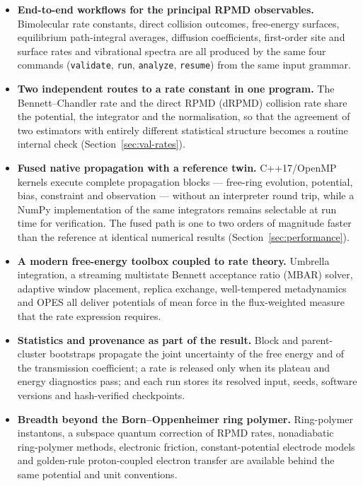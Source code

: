 \documentclass[preprint,12pt]{elsarticle}
\newcommand{\code}[1]{\texttt{#1}}
\begin{document}
\begin{itemize}
\item \textbf{End-to-end workflows for the principal RPMD observables.} Bimolecular rate constants, direct collision outcomes, free-energy surfaces, equilibrium path-integral averages, diffusion coefficients, first-order site and surface rates and vibrational spectra are all produced by the same four commands (\code{validate}, \code{run}, \code{analyze}, \code{resume}) from the same input grammar.
\item \textbf{Two independent routes to a rate constant in one program.} The Bennett--Chandler rate and the direct RPMD (dRPMD) collision rate \cite{drpmd18} share the potential, the integrator and the normalisation, so that the agreement of two estimators with entirely different statistical structure becomes a routine internal check (Section~\ref{sec:val-rates}).
\item \textbf{Fused native propagation with a reference twin.} C++17/OpenMP kernels execute complete propagation blocks --- free-ring evolution, potential, bias, constraint and observation --- without an interpreter round trip, while a NumPy implementation of the same integrators remains selectable at run time for verification. The fused path is one to two orders of magnitude faster than the reference at identical numerical results (Section~\ref{sec:performance}).
\item \textbf{A modern free-energy toolbox coupled to rate theory.} Umbrella integration, a streaming multistate Bennett acceptance ratio (MBAR) solver, adaptive window placement, replica exchange, well-tempered metadynamics and OPES all deliver potentials of mean force in the flux-weighted measure that the rate expression requires.
\item \textbf{Statistics and provenance as part of the result.} Block and parent-cluster bootstraps propagate the joint uncertainty of the free energy and of the transmission coefficient; a rate is released only when its plateau and energy diagnostics pass; and each run stores its resolved input, seeds, software versions and hash-verified checkpoints.
\item \textbf{Breadth beyond the Born--Oppenheimer ring polymer.} Ring-polymer instantons, a subspace quantum correction of RPMD rates, nonadiabatic ring-polymer methods, electronic friction, constant-potential electrode models and golden-rule proton-coupled electron transfer are available behind the same potential and unit conventions.
\end{itemize}
\end{document}
